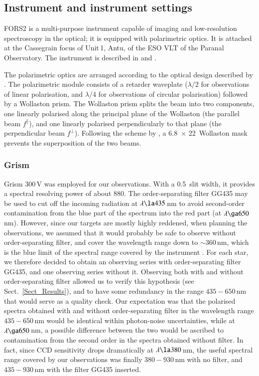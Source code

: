 \documentclass[a4paper]{aa}
\newcommand{\fo}{\ensuremath{f^\parallel}}
\newcommand{\fe}{\ensuremath{f^\perp}}
\begin{document}
\subsection{Instrument and instrument settings}

FORS2 is a multi-purpose instrument capable of imaging and
low-resolution spectroscopy in the optical; it is equipped with polarimetric
optics. It is attached at the Cassegrain focus of Unit\,1, Antu, of
the ESO VLT of the Paranal Observatory. The instrument is described in
\citet{AppRup92} and \citet{Appetal98}.

The polarimetric optics are arranged according to the optical design
described by \citet{App67}. The polarimetric module consists of a
retarder waveplate ($\lambda/2$ for observations of linear
polarisation, and $\lambda/4$ for observations of circular
polarisation) followed by a Wollaston prism.  The Wollaston prism
splits the beam into two components, one linearly polarised along the
principal plane of the Wollaston (the parallel beam \fo), and one
linearly polarised perpendicularly to that plane (the perpendicular
beam \fe). Following the scheme by \citet{Scaretal83}, a
6.8\arcmin\ $\times$ 22\arcsec\ Wollaston mask prevents the
superposition of the two beams.

\subsubsection{Grism}

Grism 300\,V was employed for our observations. With a
0.5\arcsec\ slit width, it provides a spectral resolving power of about
880. The order-separating filter GG435 may be used to cut off the
incoming radiation at $\lambda \la 435$\,nm to avoid second-order contamination
from the blue part of the spectrum into the red part (at $\lambda \ga
650$\,nm). However, since our targets are mostly highly reddened, when
planning the observations, we assumed that it would probably
be safe to observe without order-separating filter, and cover the
wavelength range down to $\sim 360$\,nm, which is
the blue limit of the spectral range covered by the instrument
\citep[for further considerations on the effects of second-order
  contamination on spectropolarimetric measurements, see][]{Patetal10}.
For each star, we therefore decided to obtain an observing
series with order-separating filter GG435, and one observing series
without it. Observing both with and without order-separating filter
allowed us to verify this hypothesis (see Sect.~\ref{Sect_Results}),
and to have some redundancy in the range $435-650$\,nm that
would serve as a quality check. Our expectation was that
the polarised spectra obtained with and without order-separating
filter in the wavelength range $435-650$\,nm would be identical within
photon-noise uncertainties, while at $\lambda \ga 650$\,nm, a possible
difference between the two would be ascribed to contamination from the
second order in the spectra obtained without filter. In fact, since CCD
sensitivity drops dramatically at $\lambda \la 380$\,nm, the useful
spectral range covered by our observations was finally $380-930$\,nm
with no filter, and $435-930$\,nm with the filter GG435 inserted.
\end{document}
